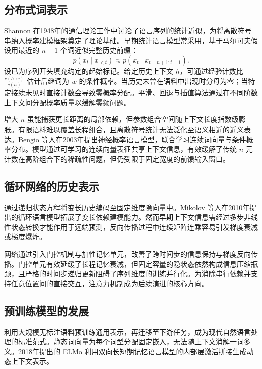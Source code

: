 \documentclass[../textbook.tex]{subfiles}
\begin{document}
\subsection{分布式词表示}
Shannon 在1948年的通信理论工作中讨论了语言序列的统计近似，为将离散符号串纳入概率建模框架奠定了理论基础\cite{shannon1948communication}。早期统计语言模型常采用，基于马尔可夫假设用最近的 $n-1$ 个词近似完整历史前缀：
\begin{equation}
 p(x_t\mid x_{<t})\approx p(x_t\mid x_{t-n+1:t-1}).
\end{equation}
设已为序列开头填充约定的起始标记。给定历史上下文 $h$，可通过经验计数比 $\frac{c(h,w)}{c(h)}$ 估计后继词为 $w$ 的条件概率。当历史未曾在语料中出现时分母为零；当特定接续未见时直接计数会导致零概率分配。平滑、回退与插值算法通过在不同阶数上下文间分配概率质量以缓解零频问题。

增大 $n$ 虽能捕获更长距离的局部依赖，但参数组合空间随上下文长度指数级膨胀。有限语料难以覆盖长程组合，且离散符号统计无法泛化至语义相近的近义表达。Bengio 等人在2003年提出神经概率语言模型，联合学习连续词向量与条件概率分布\cite{bengio2003neuralprobabilistic}。模型通过可学习的连续向量表征共享上下文信息，有效缓解了传统 $n$ 元计数在高阶组合下的稀疏性问题，但仍受限于固定宽度的前馈输入窗口。

\subsection{循环网络的历史表示}
通过递归状态方程将变长历史编码至固定维度隐向量中。Mikolov 等人在2010年提出的循环语言模型拓展了变长依赖建模能力\cite{mikolov2010rnnlm}。然而早期上下文信息需经过多步非线性状态转换才能作用于远端预测，反向传播过程中连续矩阵连乘容易引发梯度衰减或梯度爆炸。

网络通过引入门控机制与加性记忆单元，改善了跨时间步的信息保持与梯度反向传播\cite{hochreiter1997lstm}。门控单元有效延缓了长程记忆衰减，但固定容量的隐状态依然构成信息压缩瓶颈，且严格的时间步递归更新阻碍了序列维度的训练并行化。为消除串行依赖并支持任意位置间的直接交互，注意力机制成为后续演进的核心方向。

\subsection{预训练模型的发展}
利用大规模无标注语料预训练通用表示，再迁移至下游任务，成为现代自然语言处理的标准范式。静态词向量为每个词型分配固定嵌入，无法随上下文消解一词多义。2018年提出的 ELMo 利用双向长短期记忆语言模型的内部层激活拼接生成动态上下文表示\cite{peters2018elmo}。
\end{document}
